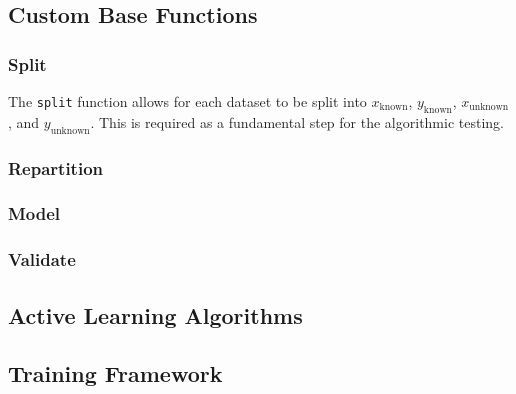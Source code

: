 \subsection{Custom Base Functions}
\subsubsection{Split}
The \lstinline{split} function allows for each dataset to be split into $x_\mathrm{known}$, $y_\mathrm{known}$, $x_\mathrm{unknown}$, and $y_\mathrm{unknown}$. This is required as a fundamental step for the algorithmic testing.
\\
\subsubsection{Repartition}
\blindtext[1]
\subsubsection{Model}
\blindtext[1]
\subsubsection{Validate}
\blindtext[1]
\subsection{Active Learning Algorithms}
\blindtext[1]
\subsection{Training Framework}
\blindtext[1]
